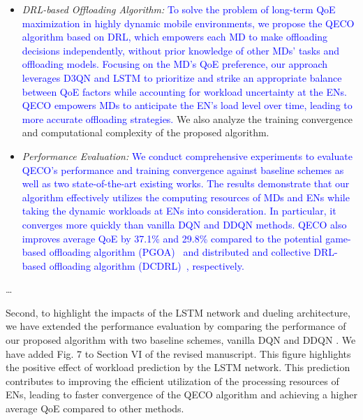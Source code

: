 \documentclass[12pt,draftclsnofoot,onecolumn]{IEEEtran}
\newenvironment{my}[2]%
{\begin{list}{}%
{\setlength{\rightmargin}{#1}\setlength{\leftmargin}{#2}}%


 \item[]{}

} {\end{list}}
\begin{document}
\begin{enumerate}
\begin{my}{1cm}{1cm}
{{\begin{itemize}
	
	\item \textit{DRL-based Offloading Algorithm:} \textcolor{blue}{To solve the problem of long-term QoE maximization in highly dynamic mobile environments, we propose the QECO algorithm based on DRL, which empowers each MD to make offloading decisions independently, without prior knowledge of other MDs' tasks and offloading models. Focusing on the MD's QoE preference, our approach leverages D3QN and LSTM to prioritize and strike an appropriate balance between QoE factors while accounting for workload uncertainty at the ENs. QECO empowers MDs to anticipate the EN's load level over time, leading to more accurate offloading strategies.} We also analyze the training convergence and computational complexity of the proposed algorithm.
	
	\item \textit{Performance Evaluation:} \textcolor{blue}{We conduct comprehensive experiments to evaluate QECO’s performance and training convergence against baseline schemes as well as two state-of-the-art existing works. The results demonstrate that our algorithm effectively utilizes the computing resources of MDs and ENs while taking the dynamic workloads at ENs into consideration. In particular, it converges more quickly than vanilla DQN and DDQN methods. QECO also improves average QoE by 37.1\% and 29.8\% compared to the potential game-based offloading algorithm (PGOA)~\cite{yang2018distributed} and distributed and collective DRL-based offloading algorithm (DCDRL)~\cite{qiu2020distributed}, respectively.}
	
\end{itemize}

\dots
}}
\end{my}
\vspace{5mm}

Second, to highlight the impacts of the LSTM network and dueling architecture, we have extended the performance evaluation by comparing the performance of our proposed algorithm with two baseline schemes, vanilla DQN and DDQN \cite{van2016deep}. We have added Fig. 7 to Section VI of the revised manuscript.
This figure highlights the positive effect of workload prediction by the LSTM network. This prediction contributes to improving the efficient utilization of the processing resources of ENs, leading to faster convergence of the QECO algorithm and achieving a higher average QoE compared to other methods. 

 




\end{enumerate}
\end{document}
